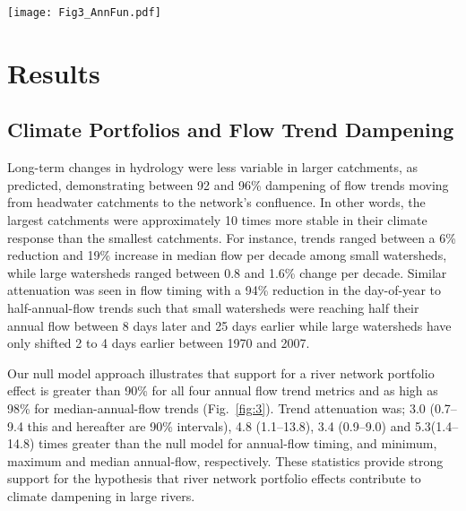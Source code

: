 \documentclass[9pt,twocolumn,twoside,lineno]{pnas-new}
\begin{document}
\begin{figure*}[h]
\centering
\texttt{[image: Fig3\_AnnFun.pdf]}
	\caption{Annual flow trend attenuation within the Fraser River basin. (\textbf{Left}) Trend estimates $\pm$ one standard error (SE, grey) plotted against watershed area (km\textsuperscript{2}), colored by climate portfolio strength (green = small, blue = large). Blue lines represent observed attenuation; orange and red represent simulated attenuation that is weaker and stronger than observed. (\textbf{Right}) Density plots show null model simulated variance exponents ($\hat{\updelta}$) and the proportion on either side of the observed variance exponent (blue). Flow metrics include long-term flow-timing shifts (change per decade in day-of-year (DOY) to half annual flow), where decreasing trends suggest more annual flow is occurring earlier in the year (a), and the percent change per decade in minimum (b), maximum (c) and median (d) annual flow. Simulated lines ignore variance in the intercept and slope to focus visually on attenuation.}
\label{fig:3}
\end{figure*}

\section*{Results}
\subsection*{Climate Portfolios and Flow Trend Dampening} Long-term changes in hydrology were less variable in larger catchments, as predicted, demonstrating between 92 and 96\% dampening of flow trends moving from headwater catchments to the network's confluence. In other words, the largest catchments were approximately 10 times more stable in their climate response than the smallest catchments. For instance, trends ranged between a 6\% reduction and 19\% increase in median flow per decade among small watersheds, while large watersheds ranged between 0.8 and 1.6\% change per decade. Similar attenuation was seen in flow timing with a 94\% reduction in the day-of-year to half-annual-flow trends such that small watersheds were reaching half their annual flow between 8 days later and 25 days earlier while large watersheds have only shifted 2 to 4 days earlier between 1970 and 2007.

Our null model approach illustrates that support for a river network portfolio effect is greater than 90\% for all four annual flow trend metrics and as high as 98\% for median-annual-flow trends (Fig.~\ref{fig:3}). Trend attenuation was; 3.0 (0.7--9.4 this and hereafter are 90\% intervals), 4.8 (1.1--13.8), 3.4 (0.9--9.0) and 5.3(1.4--14.8) times greater than the null model for annual-flow timing, and minimum, maximum and median annual-flow, respectively. These statistics provide strong support for the hypothesis that river network portfolio effects contribute to climate dampening in large rivers.
\end{document}
